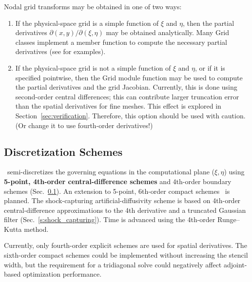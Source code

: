 \documentclass[letterpaper,10pt]{article}
\begin{document}
Nodal grid transforms may be obtained in one of two ways:
\begin{enumerate}
\item If the physical-space grid is a simple function of $\xi$ and $\eta$, then the partial derivatives $\partial(x,y)/\partial(\xi,\eta)$ may be obtained analytically. Many Grid classes implement a member function  to compute the necessary partial derivatives (see  for examples).
\item If the physical-space grid is not a simple function of $\xi$ and $\eta$, or if it is specified pointwise, then the Grid module function  may be used to compute the partial derivatives and the grid Jacobian. Currently, this is done using second-order central differences; this can contribute larger truncation error than the spatial derivatives for fine meshes. This effect is explored in Section~\ref{sec:verification}. Therefore, this option should be used with caution. (Or change it to use fourth-order derivatives!)
\end{enumerate}




\subsection{Discretization Schemes} \label{s:disc_schemes}

\code\ semi-discretizes the governing equations in the computational plane ($\xi,\eta$) using \textbf{5-point, 4th-order central-difference schemes} and 4th-order boundary schemes (Sec.~\ref{s:disc_schemes}).  An extension to 5-point, 6th-order compact schemes~\cite{Lele1992} is planned. The shock-capturing artificial-diffusivity scheme is based on 4th-order central-difference approximations to the 4th derivative and a truncated Gaussian filter (Sec.~\ref{s:shock_capturing}). Time is advanced using the 4th-order Runge--Kutta method.

Currently, only fourth-order explicit schemes are used for spatial derivatives. The sixth-order compact schemes could be implemented without increasing the stencil width, but the requirement for a tridiagonal solve could negatively affect adjoint-based optimization performance.
\end{document}
